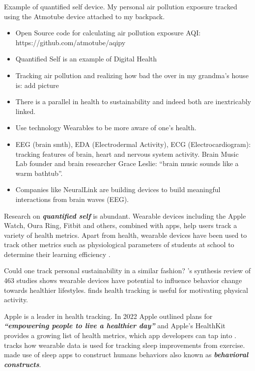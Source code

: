 \documentclass[
  letterpaper,
  DIV=11,
  numbers=noendperiod]{scrartcl}
\begin{document}
Example of quantified self device. My personal air pollution exposure
tracked using the Atmotube device attached to my backpack.

\begin{itemize}
\item
  Open Source code for calculating air pollution exposure AQI:
  https://github.com/atmotube/aqipy
\item
  Quantified Self is an example of Digital Health
\item
  Tracking air pollution and realizing how bad the over in my grandma's
  house is: add picture
\item
  There is a parallel in health to sustainability and indeed both are
  inextricably linked.
\item
  Use technology Wearables to be more aware of one's health.
\item
  EEG (brain smth), EDA (Electrodermal Activity), ECG
  (Electrocardiogram): tracking features of brain, heart and nervous
  system activity. Brain Music Lab founder and brain researcher Grace
  Leslie: ``brain music sounds like a warm bathtub''.
\item
  Companies like NeuralLink are building devices to build meaningful
  interactions from brain waves (EEG).
\end{itemize}

Research on \textbf{\emph{quantified self}} is abundant. Wearable
devices including the Apple Watch, Oura Ring, Fitbit and others,
combined with apps, help users track a variety of health metrics. Apart
from health, wearable devices have been used to track other metrics such
as physiological parameters of students at school to determine their
learning efficiency \citep{giannakosFitbitLearningCapturing2020}.

Could one track personal sustainability in a similar fashion?
\citep{shinWearableActivityTrackers2019}'s synthesis review of 463
studies shows wearable devices have potential to influence behavior
change towards healthier lifestyles.
\citet{saubadePromotingPhysicalActivity2016} finds health tracking is
useful for motivating physical activity.

Apple is a leader in health tracking. In 2022 Apple outlined plans for
\textbf{\emph{``empowering people to live a healthier day''}} and
Apple's HealthKit provides a growing list of health metrics, which app
developers can tap into
\citep{appleEmpoweringPeopleLive2022, appleWhatNewHealthKit2022}.
\citet{liuHowPhysicalExercise2019} tracks how wearable data is used for
tracking sleep improvements from exercise.
\citet{grigsby-toussaintSleepAppsBehavioral2017} made use of sleep apps
to construct humans behaviors also known as \textbf{\emph{behavioral
constructs}}.
\end{document}

